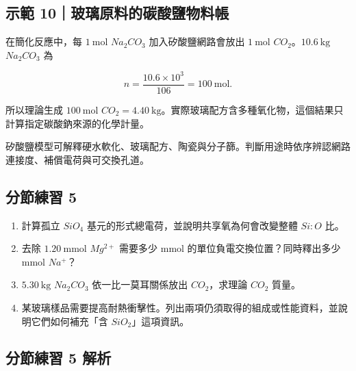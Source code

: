 \documentclass[11pt,a4paper]{article}
\providecommand{\tightlist}{%
  \setlength{\itemsep}{0pt}\setlength{\parskip}{0pt}}
\begin{document}
\begin{HandoutWorkedExample}

\subsection{示範 10｜玻璃原料的碳酸鹽物料帳}\label{ux793aux7bc4-10ux73bbux7483ux539fux6599ux7684ux78b3ux9178ux9e7dux7269ux6599ux5e33}

在簡化反應中，每 \(1\ \mathrm{mol}\) \(Na_2CO_3\) 加入矽酸鹽網路會放出 \(1\ \mathrm{mol}\) \(CO_2\)。\(10.6\ \mathrm{kg}\) \(Na_2CO_3\) 為

\[
n=\frac{10.6\times10^3}{106}=100\ \mathrm{mol}.
\]

所以理論生成 \(100\ \mathrm{mol}\) \(CO_2=4.40\ \mathrm{kg}\)。實際玻璃配方含多種氧化物，這個結果只計算指定碳酸鈉來源的化學計量。

\end{HandoutWorkedExample}

矽酸鹽模型可解釋硬水軟化、玻璃配方、陶瓷與分子篩。判斷用途時依序辨認網路連接度、補償電荷與可交換孔道。

\subsection{分節練習 5}\label{ux5206ux7bc0ux7df4ux7fd2-5}

\begin{enumerate}
\def\labelenumi{\arabic{enumi}.}
\tightlist
\item
  計算孤立 \(SiO_4\) 基元的形式總電荷，並說明共享氧為何會改變整體 \(Si:O\) 比。
\item
  去除 \(1.20\ \mathrm{mmol}\) \(Mg^{2+}\) 需要多少 mmol 的單位負電交換位置？同時釋出多少 mmol \(Na^+\)？
\item
  \(5.30\ \mathrm{kg}\) \(Na_2CO_3\) 依一比一莫耳關係放出 \(CO_2\)，求理論 \(CO_2\) 質量。
\item
  某玻璃樣品需要提高耐熱衝擊性。列出兩項仍須取得的組成或性能資料，並說明它們如何補充「含 \(SiO_2\)」這項資訊。
\end{enumerate}

\subsection{分節練習 5 解析}\label{ux5206ux7bc0ux7df4ux7fd2-5-ux89e3ux6790}
\end{document}
